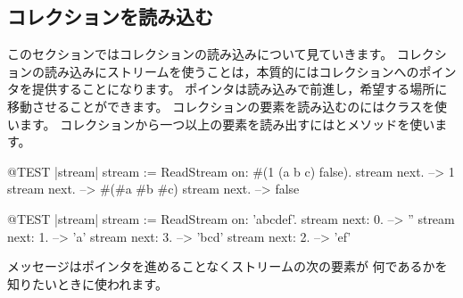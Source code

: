 \documentclass[a4paper,10pt,twoside]{book}
\begin{document}
\subsection{コレクションを読み込む}

このセクションではコレクションの読み込みについて見ていきます。
コレクションの読み込みにストリームを使うことは，本質的にはコレクションへのポインタを提供することになります。
ポインタは読み込みで前進し，希望する場所に移動させることができます。
コレクションの要素を読み込むのにはクラスを使います。
コレクションから一つ以上の要素を読み出すにはとメソッドを使います。

\begin{code}{@TEST |stream|}
stream := ReadStream on: #(1 (a b c) false).
stream next. -->   1
stream next. -->   #(#a #b #c)
stream next. -->   false
\end{code}

\begin{code}{@TEST |stream|}
stream := ReadStream on: 'abcdef'.
stream next: 0. -->   ''
stream next: 1. -->   'a'
stream next: 3. -->   'bcd'
stream next: 2. -->   'ef'
\end{code}

メッセージはポインタを進めることなくストリームの次の要素が
何であるかを知りたいときに使われます。
\end{document}
